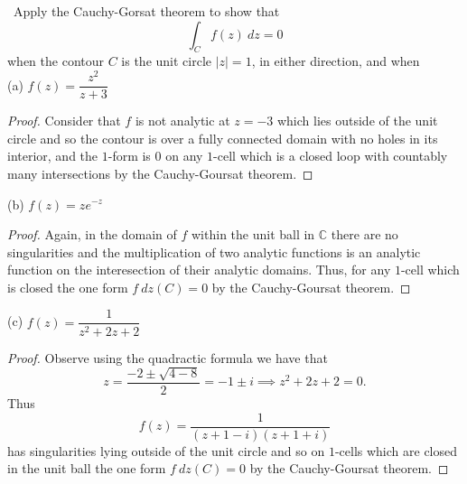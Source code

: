 \documentclass[11pt]{amsart}
\theoremstyle{definition}
\numberwithin{theorem}{section}
\numberwithin{definition}{section}
\numberwithin{equation}{section}
\begin{document}
\medskip {}\ Apply the Cauchy-Gorsat theorem to show that 
\begin{equation*}
	\int_C f(z)\ dz = 0
\end{equation*}
when the contour $C$ is the unit circle $|z| = 1$, in either direction, and when \\
(a) $f(z) = \dfrac{z^2}{z+3}$
\begin{proof}
	Consider that $f$ is not analytic at $z = -3$ which lies outside of the unit circle and so the contour
	is over a fully connected domain with no holes in its interior, and the $1$-form is $0$ on any $1$-cell which is a closed loop with countably many intersections
	by the Cauchy-Goursat theorem.
\end{proof}
\noindent (b) $f(z) = ze^{-z}$
\begin{proof}
	Again, in the domain of $f$ within the unit ball in $\mathbb{C}$ there are no singularities and the multiplication
	of two analytic functions is an analytic function on the interesection of their analytic domains. Thus,
	for any $1$-cell which is closed the one form $f\ dz(C) = 0$ by the Cauchy-Goursat theorem.
\end{proof}
\noindent (c) $f(z) = \dfrac{1}{z^2 + 2z + 2}$
\begin{proof}
	Observe using the quadractic formula we have that \begin{equation*}
		z = \frac{-2 \pm \sqrt{4 - 8}}{2} = -1 \pm i \implies z^2 + 2z +2 = 0. 
	\end{equation*}
	Thus 
	\begin{equation*}
		f(z) = \frac{1}{(z+1-i)(z+1+i)}
	\end{equation*}
	has singularities lying outside of the unit circle and so on $1$-cells which are closed in the unit ball the one form $f\ dz(C) = 0$ by the Cauchy-Goursat theorem.
\end{proof}
\end{document}
